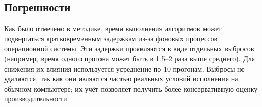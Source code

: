 \subsection{Погрешности}

Как было отмечено в методике, время выполнения алгоритмов может подвергаться кратковременным задержкам из-за фоновых процессов операционной системы. Эти задержки проявляются в виде отдельных выбросов (например, время одного прогона может быть в 1.5–2 раза выше среднего). Для снижения их влияния используется усреднение по 10 прогонам. Выбросы не удаляются, так как они являются частью реальных условий исполнения на обычном компьютере; их учёт позволяет получить более консервативную оценку производительности.
